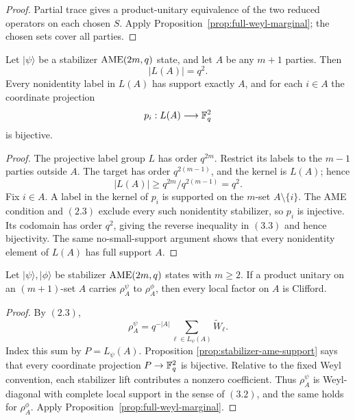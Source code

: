\begin{proof}
Partial trace gives a product-unitary equivalence of the two reduced
operators on each chosen \(S\).  Apply
Proposition~\ref{prop:full-weyl-marginal}; the chosen sets cover all
parties.
\end{proof}

\begin{proposition}
\label{prop:stabilizer-ame-support}
Let \(\lvert\psi\rangle\) be a stabilizer
\(\mathrm{AME}(2m,q)\) state, and let \(A\) be any \(m+1\) parties.  Then
\[
 |L(A)|=q^2.
\]
Every nonidentity label in \(L(A)\) has support exactly \(A\), and for
each \(i\in A\) the coordinate projection
\[
 p_i:L(A)\longrightarrow\mathbb F_q^2
\]
is bijective.
\end{proposition}

\begin{proof}
The projective label group \(L\) has order \(q^{2m}\).  Restrict its
labels to the \(m-1\) parties outside \(A\).  The target has order
\(q^{2(m-1)}\), and the kernel is \(L(A)\); hence
\[
 |L(A)|\geq q^{2m}/q^{2(m-1)}=q^2.                    \tag{3.3}
\]
Fix \(i\in A\).  A label in the kernel of \(p_i\) is supported on the
\(m\)-set \(A\setminus\{i\}\).  The AME condition and \((2.3)\) exclude
every such nonidentity stabilizer, so \(p_i\) is injective.  Its codomain
has order \(q^2\), giving the reverse inequality in \((3.3)\) and hence
bijectivity.  The same no-small-support argument shows that every
nonidentity element of \(L(A)\) has full support \(A\).
\end{proof}

\begin{proposition}
\label{prop:marginal-axes}
Let \(\lvert\psi\rangle,\lvert\phi\rangle\) be stabilizer
\(\mathrm{AME}(2m,q)\) states with \(m\geq2\).  If a product unitary on an \((m+1)\)-set \(A\)
carries \(\rho^\psi_A\) to \(\rho^\phi_A\), then every local factor on
\(A\) is Clifford.
\end{proposition}

\begin{proof}
By \((2.3)\),
\[
 \rho^\psi_A=q^{-|A|}
   \sum_{\ell\in L_\psi(A)}\widetilde W_\ell .
\]
Index this sum by \(P=L_\psi(A)\).  Proposition
\ref{prop:stabilizer-ame-support} says that every coordinate projection
\(P\to\mathbb F_q^2\) is bijective.  Relative to the fixed Weyl convention, each
stabilizer lift contributes a nonzero coefficient.  Thus
\(\rho^\psi_A\) is Weyl-diagonal with complete local support in the sense of
\((3.2)\), and the same holds for \(\rho^\phi_A\).  Apply
Proposition~\ref{prop:full-weyl-marginal}.
\end{proof}

